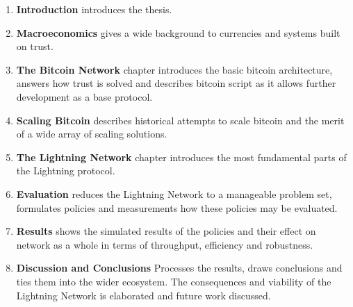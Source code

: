 \begin{enumerate}
	\item \textbf{Introduction} introduces the thesis.
	\item \textbf{Macroeconomics} gives a wide background to currencies and systems built on trust. 
	\item \textbf{The Bitcoin Network} chapter introduces the basic bitcoin architecture, answers how trust is solved and describes bitcoin script as it allows further development as a base protocol.
	\item \textbf{Scaling Bitcoin} describes historical attempts to scale bitcoin and the merit of a wide array of scaling solutions.
	\item \textbf{The Lightning Network} chapter introduces the most fundamental parts of the Lightning protocol.
	\item \textbf{Evaluation} reduces the Lightning Network to a manageable problem set, formulates policies and measurements how these policies may be evaluated.
	\item \textbf{Results} shows the simulated results of the policies and their effect on network as a whole in terms of throughput, efficiency and robustness.
	\item \textbf{Discussion and Conclusions} Processes the results, draws conclusions and ties them into the wider ecosystem. The consequences and viability of the Lightning Network is elaborated and future work discussed. 
\end{enumerate}